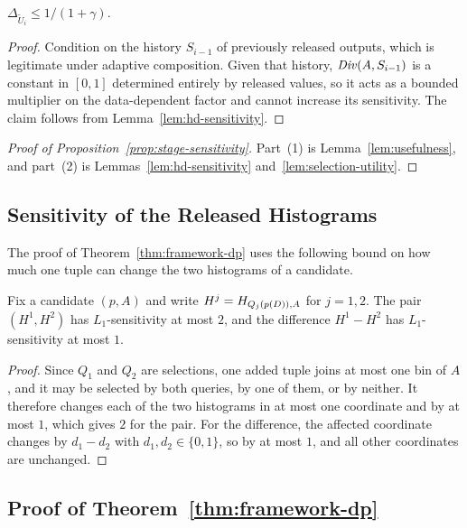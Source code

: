 \begin{lemma}
\label{lem:selection-utility}
$\Delta_{\widetilde{U}_i}\le 1/(1+\gamma)$.
\end{lemma}

\begin{proof}
Condition on the history $S_{i-1}$ of previously released outputs, which is legitimate under adaptive composition.
Given that history, $\mathit{Div}(A,S_{i-1})$ is a constant in $[0,1]$ determined entirely by released values, so it acts as a bounded multiplier on the data-dependent factor and cannot increase its sensitivity.
The claim follows from Lemma~\ref{lem:hd-sensitivity}.
\end{proof}

\begin{proof}[Proof of Proposition~\ref{prop:stage-sensitivity}]
Part~(1) is Lemma~\ref{lem:usefulness}, and part~(2) is Lemmas~\ref{lem:hd-sensitivity} and~\ref{lem:selection-utility}.
\end{proof}

\subsection{Sensitivity of the Released Histograms}
\label{app:proof-hist}

The proof of Theorem~\ref{thm:framework-dp} uses the following bound on how much one tuple can change the two histograms of a candidate.

\begin{lemma}
\label{prop:histogram-release-sensitivity}
Fix a candidate $(p,A)$ and write $H^j=H_{Q_j(p(D)),A}$ for $j=1,2$.
The pair $(H^1,H^2)$ has $L_1$-sensitivity at most $2$, and the difference $H^1-H^2$ has $L_1$-sensitivity at most $1$.
\end{lemma}

\begin{proof}
Since $Q_1$ and $Q_2$ are selections, one added tuple joins at most one bin of $A$, and it may be selected by both queries, by one of them, or by neither.
It therefore changes each of the two histograms in at most one coordinate and by at most $1$, which gives $2$ for the pair.
For the difference, the affected coordinate changes by $d_1-d_2$ with $d_1,d_2\in\{0,1\}$, so by at most $1$, and all other coordinates are unchanged.
\end{proof}

\subsection{Proof of Theorem~\ref{thm:framework-dp}}
\label{app:proof-privacy}

